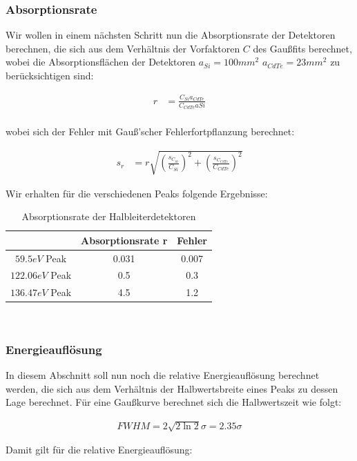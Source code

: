 \documentclass[12pt]{article}
\begin{document}
\subsubsection{Absorptionsrate}

Wir wollen in einem nächsten Schritt nun die Absorptionsrate der Detektoren berechnen, die sich aus dem Verhältnis der Vorfaktoren $C$ des Gaußfits berechnet, wobei die Absorptionsflächen der Detektoren $a_{Si}=100mm^2$ $a_{CdTe}=23mm^2$ zu berücksichtigen sind:

\begin{align*}
r&=\frac{C_{Si}a_{CdTe}}{C_{CdTe}a{Si}}\\
\end{align*}

wobei sich der Fehler mit Gauß'scher Fehlerfortpflanzung berechnet:

\begin{align*}
s_r&=r \sqrt{\left(\frac{s_{C_{Si}}}{C_{Si}}\right)^2+\left(\frac{s_{C_{CdTe}}}{C_{CdTe}}\right)^2}
\end{align*}

Wir erhalten für die verschiedenen Peaks folgende Ergebnisse:
\begin{table}[h!]

{\centering{}
\begin{tabular}{c||c|c}
					& Absorptionsrate r & Fehler	\\ \hline\hline
$59.5 eV$ Peak		& 0.031			    & 0.007		\\ \hline
$122.06 eV$ Peak	& 0.5 			    & 0.3	\\ \hline
$136.47 eV$ Peak	& 4.5 		     	& 1.2
\end{tabular}\\}
 \caption{Absorptionsrate
  der Halbleiterdetektoren}
\end{table}
\subsubsection{Energieauflösung}
In diesem Abschnitt soll nun noch die relative Energieauflösung berechnet werden, die sich aus dem Verhältnis der Halbwertsbreite eines Peaks zu dessen Lage berechnet. Für eine Gaußkurve berechnet sich die Halbwertszeit wie folgt:

\begin{align*}
FWHM = 2\sqrt{2\ln2}\sigma = 2.35 \sigma
\end{align*}

Damit gilt für die relative Energieauflösung:
\end{document}
